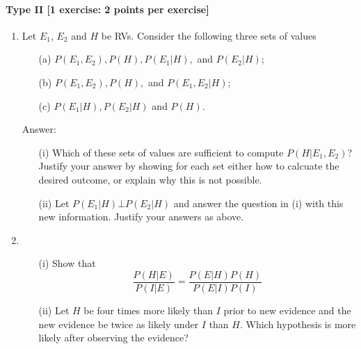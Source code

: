 \documentclass{article}
\begin{document}
\begin{enumerate}
\end{enumerate}		

\paragraph{Type II [1 exercise: 2 points per exercise]}
\begin{enumerate}
	\item Let $E_1$, $E_2$ and $H$ be RVs. Consider the following three sets of values
		    \begin{itemize}
			    \item[(a)] $P(E_1,E_2), P(H), P(E_1 |H),$ and $P(E_2|H)$;
			    \item[(b)] $P(E_1,E_2), P(H),$ and $P(E_1,E_2|H)$;
			    \item[(c)] $P(E_1|H), P(E_2|H)$ and $P(H)$.
		    \end{itemize}

    Answer:
    \begin{itemize}
	    \item[(i)] Which of these sets of values are sufficient to compute $P(H|E_1,E_2)$? 		    Justify your answer by showing for each set either how to calcuate the desired outcome, or explain why this is not possible.
	    \item[(ii)] Let $P(E_1|H) \bot P(E_2|H)$ and answer the question in (i) with this new information. Justify your answers as above.
    \end{itemize}
    \item \begin{itemize}
	  \item[(i)] Show that $$\frac{P(H|E)}{P(I|E)} = \frac{P(E|H)P(H)}{P(E|I)P(I)}$$
	  \item[(ii)] Let $H$ be four times more likely than $I$ prior to new evidence and the new evidence be twice as likely under $I$ than $H$. Which hypothesis is more likely after observing the evidence?
	  \end{itemize}
\end{enumerate}
\end{document}

